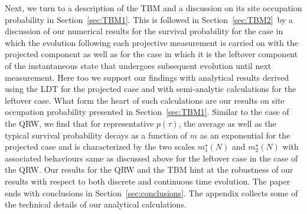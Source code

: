\documentclass[12pt]{iopart}
\begin{document}
Next, we turn to a description of the TBM and a discussion on its site occupation probability in
Section~\ref{sec:TBM1}. This is followed in Section~\ref{sec:TBM2}\, by a
discussion of our numerical results for the survival probability 
for the case in which the evolution following each projective measurement is
carried on with the projected component as well as for the case in which it
is the leftover component of the instantaneous state that undergoes subsequent evolution until next measurement.
Here too we support our findings with analytical
results derived using the LDT for the projected case and with
semi-analytic calculations for the leftover case. What form the heart of such calculations are our results on site occupation probability presented in Section~\ref{sec:TBM1}.  Similar to the case
of the QRW, we find that for representative $p(\tau)$, the average as well as the typical survival
probability decays as a function of
$m$ as an exponential for the projected case and is characterized by the two  scales $m_1^\star(N)$ and $m_2^\star(N)$ with associated behaviours same as discussed above for the leftover case in the case of the QRW.  Our results for the QRW and the TBM  hint at the robustness of our results with respect to both
discrete and continuous time evolution.  The paper ends with conclusions
in Section~\ref{sec:conclusions}. The appendix collects some of the
technical details of our analytical calculations.
\end{document}
